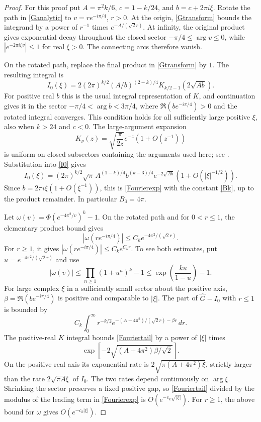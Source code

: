 \documentclass[11pt]{amsart}
\theoremstyle{definition}
\theoremstyle{remark}
\numberwithin{equation}{section}
\newcommand{\dd}{\,d}
\begin{document}
\begin{proof}
For this proof put $A=\pi^2k/6$, $c=1-k/24$, and $b=c+2\pi i\xi$. Rotate the path in \eqref{Ganalytic} to $v=re^{-i\pi/4}$, $r>0$. At the origin, \eqref{Gtransform} bounds the integrand by a power of $r^{-1}$ times $e^{-A/(\sqrt2r)}$. At infinity, the original product gives exponential decay throughout the closed sector $-\pi/4\le\arg v\le0$, while $|e^{-2\pi i\xi v}|\le1$ for real $\xi>0$. The connecting arcs therefore vanish.

On the rotated path, replace the final product in \eqref{Gtransform} by $1$. The resulting integral is
\begin{equation}\label{I0}
 I_0(\xi)=2(2\pi)^{k/2}
       (A/b)^{(2-k)/4}K_{k/2-1}(2\sqrt{Ab}).
\end{equation}
For positive real $b$ this is the usual integral representation of $K$, and continuation gives it in the sector $-\pi/4<\arg b<3\pi/4$, where $\Re(be^{-i\pi/4})>0$ and the rotated integral converges. This condition holds for all sufficiently large positive $\xi$, also when $k>24$ and $c<0$. The large-argument expansion
\[
 K_\nu(z)=\sqrt{\frac\pi{2z}}e^{-z}(1+O(z^{-1}))
\]
is uniform on closed subsectors containing the arguments used here; see \cite[\S\S10.32, 10.40]{DLMF}. Substitution into \eqref{I0} gives
\[
 I_0(\xi)=(2\pi)^{k/2}\sqrt\pi\,
 A^{(1-k)/4}b^{(k-3)/4}e^{-2\sqrt{Ab}}(1+O(|\xi|^{-1/2})).
\]
Since $b=2\pi i\xi(1+O(\xi^{-1}))$, this is \eqref{Fourierexp} with the constant \eqref{Bk}, up to the product remainder. In particular $B_3=4\pi$.

Let $\omega(v)=\Phi(e^{-4\pi^2/v})^k-1$. On the rotated path and for $0<r\le1$, the elementary product bound gives
\[
 |\omega(re^{-i\pi/4})|\le C_k e^{-4\pi^2/(\sqrt2r)}.
\]
For $r\ge1$, it gives $|\omega(re^{-i\pi/4})|\le C_ke^{C_kr}$. To see both estimates, put $u=e^{-4\pi^2/(\sqrt2r)}$ and use
\[
 |\omega(v)|\le\prod_{n\ge1}(1+u^n)^k-1
            \le\exp\!\left(\frac{ku}{1-u}\right)-1.
\]
For large complex $\xi$ in a sufficiently small sector about the positive axis, $\beta=\Re(be^{-i\pi/4})$ is positive and comparable to $|\xi|$. The part of $\widehat G-I_0$ with $r\le1$ is bounded by
\begin{equation}\label{Fouriertail}
 C_k\int_0^\infty r^{-k/2}
       e^{-(A+4\pi^2)/(\sqrt2r)-\beta r}\dd r.
\end{equation}
The positive-real $K$ integral bounds \eqref{Fouriertail} by a power of $|\xi|$ times
\[
 \exp\!\left[-2\sqrt{(A+4\pi^2)\beta/\sqrt2}\right].
\]
On the positive real axis its exponential rate is
$2\sqrt{\pi(A+4\pi^2)\xi}$, strictly larger than the rate $2\sqrt{\pi A\xi}$ of $I_0$. The two rates depend continuously on $\arg\xi$. Shrinking the sector preserves a fixed positive gap, so \eqref{Fouriertail} divided by the modulus of the leading term in \eqref{Fourierexp} is $O(e^{-c_k\sqrt{|\xi|}})$. For $r\ge1$, the above bound for $\omega$ gives $O(e^{-c_k|\xi|})$.


\end{proof}
\end{document}
